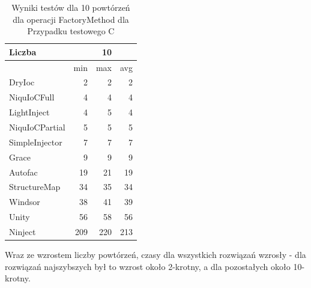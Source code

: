 \documentclass[12pt]{article}
\begin{document}
\begin{table}[H]
\captionsetup{belowskip=0pt,aboveskip=0pt}
\begin{center}
\begin{small}
	\begin{tabular}{ | l | r r r | }
    		\hline
Liczba & & 10 & \\ \hline
 & min & max & avg \\ \hline
DryIoc & 2 & 2 & 2 \\ \hline
NiquIoCFull & 4 & 4 & 4 \\ \hline
LightInject & 4 & 5 & 4 \\ \hline
NiquIoCPartial & 5 & 5 & 5 \\ \hline
SimpleInjector & 7 & 7 & 7 \\ \hline
Grace & 9 & 9 & 9 \\ \hline
Autofac & 19 & 21 & 19 \\ \hline
StructureMap & 34 & 35 & 34 \\ \hline
Windsor & 38 & 41 & 39 \\ \hline
Unity & 56 & 58 & 56 \\ \hline
Ninject & 209 & 220 & 213 \\ \hline
  	\end{tabular}
\end{small}
\end{center}
\caption{Wyniki testów dla 10 powtórzeń dla operacji FactoryMethod dla Przypadku testowego C}
\label{TestCaseC_FactoryMethod10}
\end{table}
Wraz ze wzrostem liczby powtórzeń, czasy dla wszystkich rozwiązań wzrosły - dla rozwiązań najszybszych był to wzrost około 2-krotny, a dla pozostałych około 10-krotny.
\\ \\
\end{document}
